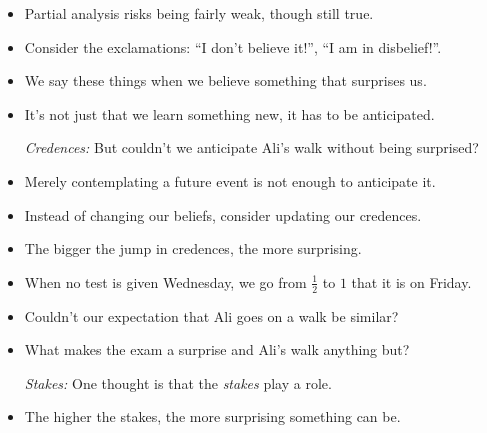 \documentclass[a4paper, 11pt]{article} %
\begin{document}
\begin{itemize}
    \item Partial analysis risks being fairly weak, though still true.
    \item Consider the exclamations: ``I don't believe it!'', ``I am in disbelief!''.
    \item We say these things when we believe something that surprises us.
    \item It's not just that we learn something new, it has to be anticipated.
  \item[\it Credences:] But couldn't we anticipate Ali's walk without being surprised?
    \item Merely contemplating a future event is not enough to anticipate it.
    \item Instead of changing our beliefs, consider updating our credences.
    \item The bigger the jump in credences, the more surprising.
    \item When no test is given Wednesday, we go from $\frac{1}{2}$ to $1$ that it is on Friday. 
    \item Couldn't our expectation that Ali goes on a walk be similar?
    \item What makes the exam a surprise and Ali's walk anything but?
  \item[\it Stakes:] One thought is that the \textit{stakes} play a role.
    \item The higher the stakes, the more surprising something can be.
\end{itemize}



\end{document}
